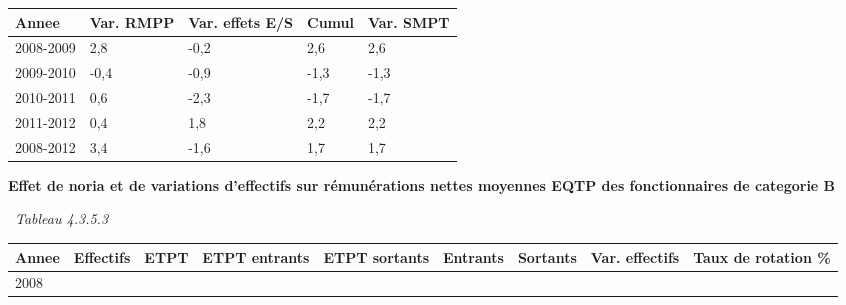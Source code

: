 \begin{longtable}[]{@{}lllll@{}}
\toprule
Annee & Var. RMPP & Var. effets E/S & Cumul & Var. SMPT\tabularnewline
\midrule
\endhead
2008-2009 & 2,8 & -0,2 & 2,6 & 2,6\tabularnewline
2009-2010 & -0,4 & -0,9 & -1,3 & -1,3\tabularnewline
2010-2011 & 0,6 & -2,3 & -1,7 & -1,7\tabularnewline
2011-2012 & 0,4 & 1,8 & 2,2 & 2,2\tabularnewline
2008-2012 & 3,4 & -1,6 & 1,7 & 1,7\tabularnewline
\bottomrule
\end{longtable}

\textbf{Effet de noria et de variations d'effectifs sur rémunérations
nettes moyennes EQTP des fonctionnaires de categorie B}

~\emph{Tableau 4.3.5.3}

\begin{longtable}[]{@{}lllllllll@{}}
\toprule
\begin{minipage}[b]{0.05\columnwidth}\raggedright
Annee\strut
\end{minipage} & \begin{minipage}[b]{0.08\columnwidth}\raggedright
Effectifs\strut
\end{minipage} & \begin{minipage}[b]{0.05\columnwidth}\raggedright
ETPT\strut
\end{minipage} & \begin{minipage}[b]{0.10\columnwidth}\raggedright
ETPT entrants\strut
\end{minipage} & \begin{minipage}[b]{0.10\columnwidth}\raggedright
ETPT sortants\strut
\end{minipage} & \begin{minipage}[b]{0.07\columnwidth}\raggedright
Entrants\strut
\end{minipage} & \begin{minipage}[b]{0.07\columnwidth}\raggedright
Sortants\strut
\end{minipage} & \begin{minipage}[b]{0.11\columnwidth}\raggedright
Var. effectifs\strut
\end{minipage} & \begin{minipage}[b]{0.14\columnwidth}\raggedright
Taux de rotation \%\strut
\end{minipage}\tabularnewline
\midrule
\endhead
\begin{minipage}[t]{0.05\columnwidth}\raggedright
2008\strut
\end{minipage} & \begin{minipage}[t]{0.08\columnwidth}\raggedright

\end{minipage}
\end{longtable}
